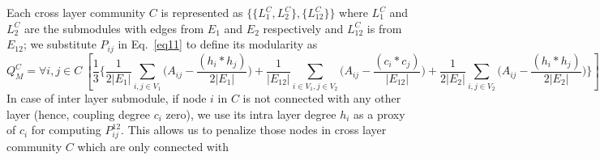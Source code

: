 Each cross layer community $C$ is represented as $\{\{L^C_1, L^C_2\}, \{L^C_{12}\}\}$ where
$L^C_1$ and $L^C_2$ are the submodules with edges from $E_1$ and $E_2$ respectively and $L^C_{12}$ is from $E_{12}$;
we substitute $P_{ij}$ in Eq.~\ref{eq11} to define its modularity as
\vspace{-0.1in}
\begin{dmath}\label{eq_mid}
Q_M^C= {\forall i,j \in C}~ \left[ \frac{1}{3} \bigg \{
 \frac{1}{2\left \vert E_1 \right \vert}
 \sum_{i,j \in V_1}\big(A_{ij} - \frac{ (h_i * h_j)}{2\left \vert E_1 \right \vert}\big) +
 \frac{1}{\left \vert E_{12} \right \vert}
 \sum_{i \in V_1, j \in V_2}\big(A_{ij} - \frac{ (c_i * c_j)}{\left \vert E_{12} \right \vert}\big) +
 \frac{1}{2\left \vert E_{2} \right \vert}
 \sum_{i,j \in V_2}\big(A_{ij} - \frac{ (h_i * h_j)}{2\left \vert E_2 \right \vert}\big)
    \bigg \}\right]
\end{dmath}
\vspace{-0.08in}
In case of inter layer submodule, if node $i$ in $C$ is not connected with any other layer (hence, coupling degree $c_i$ zero), we
use its intra layer degree $h_i$ as a proxy of $c_i$ for computing $P^{12}_{ij}$. This allows us to penalize those
nodes in cross layer community $C$ which are only connected with
